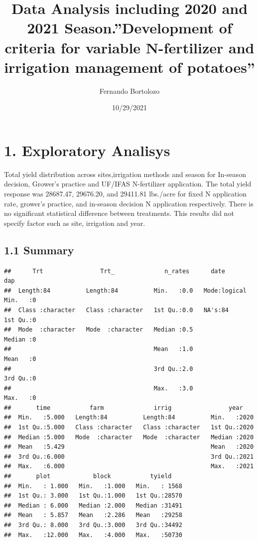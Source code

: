\documentclass[
]{article}
\title{Data Analysis including 2020 and 2021 Season.''Development of
criteria for variable N-fertilizer and irrigation management of
potatoes''}
\author{Fernando Bortolozo}
\date{10/29/2021}
\begin{document}
\maketitle

\hypertarget{exploratory-analisys}{%
\section{1. Exploratory Analisys}\label{exploratory-analisys}}

Total yield distribution across sites,irrigation methods and season for
In-season decision, Grower's practice and UF/IFAS N-fertilizer
application. The total yield response was 28687.47, 29676.20, and
29411.81 lbs./acre for fixed N application rate, grower's practice, and
in-season decision N application respectively. There is no significant
statistical difference between treatments. This results did not specify
factor such as site, irrigation and year.

\hypertarget{summary}{%
\subsection{\texorpdfstring{\textbf{1.1
Summary}}{1.1 Summary}}\label{summary}}

\begin{verbatim}
##      Trt                Trt_              n_rates      date              dap   
##  Length:84          Length:84          Min.   :0.0   Mode:logical   Min.   :0  
##  Class :character   Class :character   1st Qu.:0.0   NA's:84        1st Qu.:0  
##  Mode  :character   Mode  :character   Median :0.5                  Median :0  
##                                        Mean   :1.0                  Mean   :0  
##                                        3rd Qu.:2.0                  3rd Qu.:0  
##                                        Max.   :3.0                  Max.   :0  
##       time           farm              irrig                year     
##  Min.   :5.000   Length:84          Length:84          Min.   :2020  
##  1st Qu.:5.000   Class :character   Class :character   1st Qu.:2020  
##  Median :5.000   Mode  :character   Mode  :character   Median :2020  
##  Mean   :5.429                                         Mean   :2020  
##  3rd Qu.:6.000                                         3rd Qu.:2021  
##  Max.   :6.000                                         Max.   :2021  
##       plot            block           tyield     
##  Min.   : 1.000   Min.   :1.000   Min.   : 1568  
##  1st Qu.: 3.000   1st Qu.:1.000   1st Qu.:28570  
##  Median : 6.000   Median :2.000   Median :31491  
##  Mean   : 5.857   Mean   :2.286   Mean   :29258  
##  3rd Qu.: 8.000   3rd Qu.:3.000   3rd Qu.:34492  
##  Max.   :12.000   Max.   :4.000   Max.   :50730
\end{verbatim}
\end{document}
